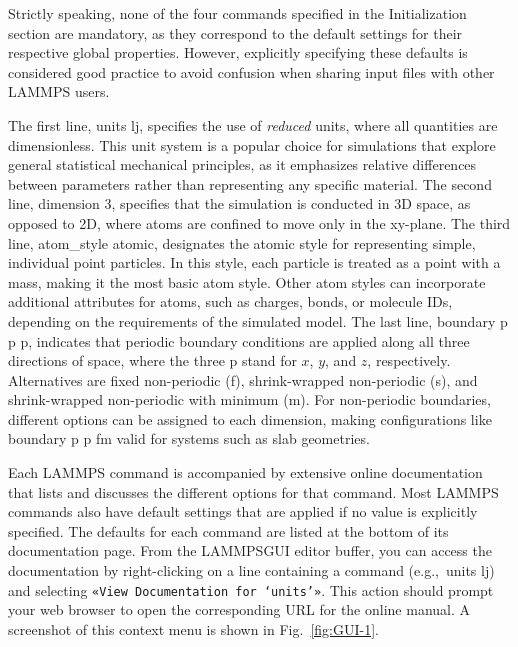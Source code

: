 \documentclass[9pt,tutorial]{livecoms}
\newcommand{\lmpcmd}[1]{\colorbox{listing}{\textcolor{command}{\small{#1}}}} %
\newcommand{\guicmd}[1]{\textcolor{command}{\texttt{«#1»}}} %
\newcommand{\lammpsgui}{\textsf{LAMMPS\textendash GUI}}
\begin{document}
\begin{note}
  Strictly speaking, none of the four commands specified in the
  Initialization section are mandatory, as they correspond to the
  default settings for their respective global properties.  However,
  explicitly specifying these defaults is considered good practice to
  avoid confusion when sharing input files with other LAMMPS users.
\end{note}

The first line, \lmpcmd{units lj}, specifies the use of \emph{reduced}
units, where all quantities are dimensionless.  This unit system is a
popular choice for simulations that explore general statistical
mechanical principles, as it emphasizes relative differences between
parameters rather than representing any specific material.  The second
line, \lmpcmd{dimension 3}, specifies that the simulation is conducted
in 3D space, as opposed to 2D, where atoms are confined to move only in
the xy-plane.  The third line, \lmpcmd{atom\_style atomic}, designates
the atomic style for representing simple, individual point particles.
In this style, each particle is treated as a point with a mass, making
it the most basic atom style.  Other atom styles can incorporate
additional attributes for atoms, such as charges, bonds, or molecule
IDs, depending on the requirements of the simulated model.  The last
line, \lmpcmd{boundary p p p}, indicates that periodic boundary
conditions are applied along all three directions of space, where the
three p stand for $x$, $y$, and $z$, respectively.  Alternatives are
fixed non-periodic (f), shrink-wrapped non-periodic (s), and
shrink-wrapped non-periodic with minimum (m).  For non-periodic
boundaries, different options can be assigned to each dimension, making
configurations like \lmpcmd{boundary p p fm} valid for systems such as
slab geometries.

\begin{note}
  Each LAMMPS command is accompanied by extensive online documentation
  that {\color{blue} lists and discusses} the different options for that
  command.  {\color{blue}Most LAMMPS commands also have default settings
    that are applied if no value is explicitly specified.  The defaults
    for each command are listed at the bottom of its documentation
    page.}  From the \lammpsgui{} editor buffer, you can access the
  documentation by right-clicking on a line containing a command
  (e.g.,~\lmpcmd{units lj}) and selecting \guicmd{View Documentation for
    `units'}.  This action should prompt your web browser to open the
  corresponding URL for the online manual.  A screenshot of this context
  menu is shown in Fig.~\ref{fig:GUI-1}.
\end{note}
\end{document}

